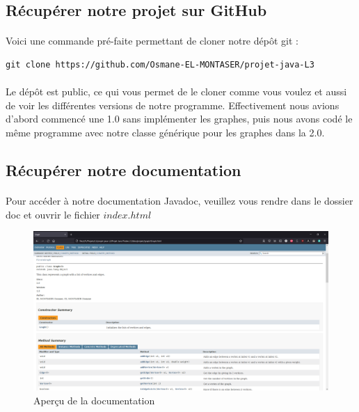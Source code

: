 \documentclass[12pt]{article}
\begin{document}
\subsection{Récupérer notre projet sur GitHub}
\paragraph{} Voici une commande pré-faite permettant de cloner notre dépôt git :
\begin{lstlisting}[style=BashStyle]
git clone https://github.com/Osmane-EL-MONTASER/projet-java-L3
\end{lstlisting}
\paragraph{} Le dépôt est public, ce qui vous permet de le cloner comme vous voulez et aussi de voir les différentes versions de notre programme.
Effectivement nous avions d'abord commencé une 1.0 sans implémenter les graphes, puis nous avons codé le même programme avec notre classe générique pour les graphes dans la 2.0.
\subsection{Récupérer notre documentation}
\paragraph{} Pour accéder à notre documentation Javadoc, veuillez vous rendre dans le dossier doc et ouvrir le fichier $index.html$
\begin{figure}[H]
\includegraphics[width=16cm]{doc}
\centering
\caption{Aperçu de la documentation}
\end{figure}
\end{document}
